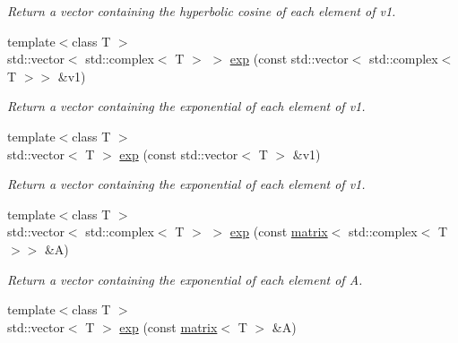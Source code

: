\begin{DoxyCompactItemize}
\begin{DoxyCompactList}\small\item\em Return a vector containing the hyperbolic cosine of each element of v1. \end{DoxyCompactList}\item 
\hypertarget{namespacekeycpp_a50caa1bee883d40591442882e777a67b}{{\footnotesize template$<$class T $>$ }\\std\-::vector$<$ std\-::complex$<$ T $>$ $>$ \hyperlink{namespacekeycpp_a50caa1bee883d40591442882e777a67b}{exp} (const std\-::vector$<$ std\-::complex$<$ T $>$$>$ \&v1)}\label{namespacekeycpp_a50caa1bee883d40591442882e777a67b}

\begin{DoxyCompactList}\small\item\em Return a vector containing the exponential of each element of v1. \end{DoxyCompactList}\item 
\hypertarget{namespacekeycpp_a66a68550626786b480e7c8d02aaf9039}{{\footnotesize template$<$class T $>$ }\\std\-::vector$<$ T $>$ \hyperlink{namespacekeycpp_a66a68550626786b480e7c8d02aaf9039}{exp} (const std\-::vector$<$ T $>$ \&v1)}\label{namespacekeycpp_a66a68550626786b480e7c8d02aaf9039}

\begin{DoxyCompactList}\small\item\em Return a vector containing the exponential of each element of v1. \end{DoxyCompactList}\item 
\hypertarget{namespacekeycpp_a6a8bd2143a6d613b560f71d0b99b346f}{{\footnotesize template$<$class T $>$ }\\std\-::vector$<$ std\-::complex$<$ T $>$ $>$ \hyperlink{namespacekeycpp_a6a8bd2143a6d613b560f71d0b99b346f}{exp} (const \hyperlink{classkeycpp_1_1matrix}{matrix}$<$ std\-::complex$<$ T $>$$>$ \&A)}\label{namespacekeycpp_a6a8bd2143a6d613b560f71d0b99b346f}

\begin{DoxyCompactList}\small\item\em Return a vector containing the exponential of each element of A. \end{DoxyCompactList}\item 
\hypertarget{namespacekeycpp_a6cc8180fd2f17512f0f75957615da294}{{\footnotesize template$<$class T $>$ }\\std\-::vector$<$ T $>$ \hyperlink{namespacekeycpp_a6cc8180fd2f17512f0f75957615da294}{exp} (const \hyperlink{classkeycpp_1_1matrix}{matrix}$<$ T $>$ \&A)}\label{namespacekeycpp_a6cc8180fd2f17512f0f75957615da294}


\end{DoxyCompactItemize}
